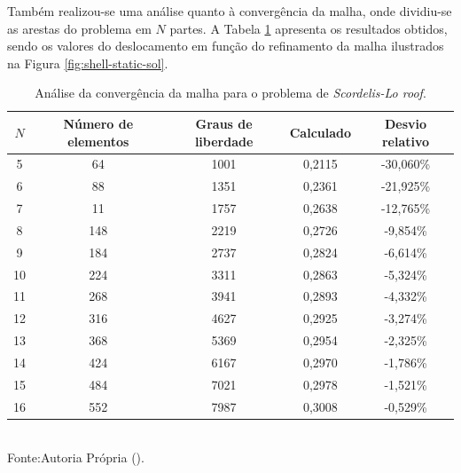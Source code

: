 Também realizou-se uma análise quanto à convergência da malha, onde dividiu-se as arestas do problema em $N$ partes. A Tabela \ref{tab:scordelis-sol} apresenta os resultados obtidos, sendo os valores do deslocamento em função do refinamento da malha ilustrados na Figura \ref{fig:shell-static-sol}.

\begin{table}[h!]
    \centering
    \caption{Análise da convergência da malha para o problema de \textit{Scordelis-Lo roof}.}
    \begin{tabular}{ccccc}
        \hline
        $N$ & Número de elementos & Graus de liberdade & Calculado & Desvio relativo \\\hline
        5   & 64                  & 1001               & 0,2115    & -30,060\%       \\
        6   & 88                  & 1351               & 0,2361    & -21,925\%       \\
        7   & 11                  & 1757               & 0,2638    & -12,765\%       \\
        8   & 148                 & 2219               & 0,2726    & -9,854\%        \\
        9   & 184                 & 2737               & 0,2824    & -6,614\%        \\
        10  & 224                 & 3311               & 0,2863    & -5,324\%        \\
        11  & 268                 & 3941               & 0,2893    & -4,332\%        \\
        12  & 316                 & 4627               & 0,2925    & -3,274\%        \\
        13  & 368                 & 5369               & 0,2954    & -2,325\%        \\
        14  & 424                 & 6167               & 0,2970    & -1,786\%        \\
        15  & 484                 & 7021               & 0,2978    & -1,521\%        \\
        16  & 552                 & 7987               & 0,3008    & -0,529\%        \\\hline
    \end{tabular}
    \\Fonte:Autoria Própria (\the\year).
    \label{tab:scordelis-sol}
\end{table}

